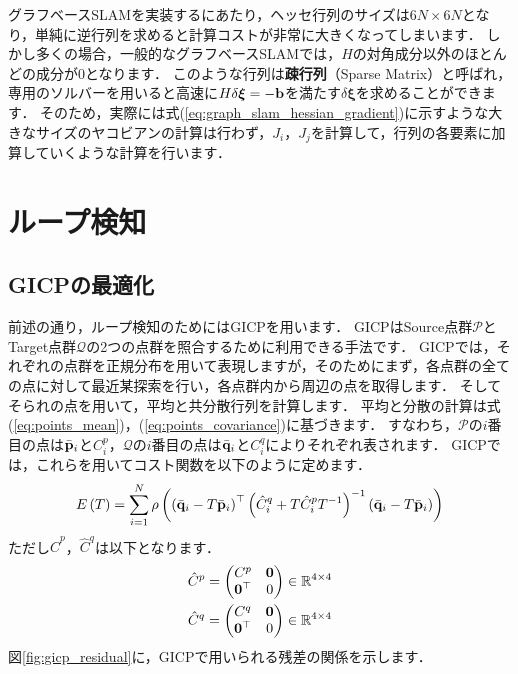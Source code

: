 グラフベースSLAMを実装するにあたり，ヘッセ行列のサイズは$6N \times 6N$となり，単純に逆行列を求めると計算コストが非常に大きくなってしまいます．
しかし多くの場合，一般的なグラフベースSLAMでは，$H$の対角成分以外のほとんどの成分が0となります．
このような行列は{\bf 疎行列}（Sparse Matrix）と呼ばれ，専用のソルバーを用いると高速に$H \delta \boldsymbol \xi = -{\bf b}$を満たす$\delta \boldsymbol \xi$を求めることができます．
そのため，実際には式(\ref{eq:graph_slam_hessian_gradient})に示すような大きなサイズのヤコビアンの計算は行わず，$J_{i}$，$J_{j}$を計算して，行列の各要素に加算していくような計算を行います．













\section{ループ検知}
\label{subsec:gicp}

\subsection{GICPの最適化}

前述の通り，ループ検知のためにはGICPを用います．
GICPはSource点群$\mathcal{P}$とTarget点群$\mathcal{Q}$の2つの点群を照合するために利用できる手法です．
GICPでは，それぞれの点群を正規分布を用いて表現しますが，そのためにまず，各点群の全ての点に対して最近某探索を行い，各点群内から周辺の点を取得します．
そしてそられの点を用いて，平均と共分散行列を計算します．
平均と分散の計算は式(\ref{eq:points_mean})，(\ref{eq:points_covariance})に基づきます．
すなわち，$\mathcal{P}$の$i$番目の点は$\bar{ {\bf p} }_{i}$と$C_{i}^{p}$，$\mathcal{Q}$の$i$番目の点は$\bar{ {\bf q} }_{i}$と$C_{i}^{q}$によりそれぞれ表されます．
GICPでは，これらを用いてコスト関数を以下のように定めます．
%
\begin{align}
  E \left( T \right) = \sum_{i=1}^{N} \rho \left( \left( \bar{ {\bf q} }_{i} - T \bar{ {\bf p} }_{i} \right)^{\top} \left( \hat{C}_{i}^{q} + T \hat{C}_{i}^{p} T^{-1} \right)^{-1} \left( \bar{ {\bf q} }_{i} - T \bar{ {\bf p} }_{i} \right) \right)
  \label{eq:gicp_cost_function}
\end{align}
%
ただし$\hat{C}^{p}$，$\hat{C}^{q}$は以下となります．
%
\begin{align}
  \begin{gathered}
    \hat{C}^{p} = \left( \begin{matrix}
      C^{p}          & {\bf 0} \\
      {\bf 0}^{\top} & 0
    \end{matrix} \right) \in \mathbb{R}^{4 \times 4} \\
%
    \hat{C}^{q} = \left( \begin{matrix}
      C^{q}          & {\bf 0} \\
      {\bf 0}^{\top} & 0
    \end{matrix} \right) \in \mathbb{R}^{4 \times 4}
  \end{gathered}
\end{align}
%
図\ref{fig:gicp_residual}に，GICPで用いられる残差の関係を示します．

